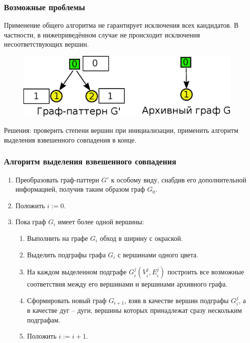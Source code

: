 \documentclass{beamer}
\begin{document}
\begin{frame}
\frametitle{Возможные проблемы}
Применение общего алгоритма не гарантирует исключения всех кандидатов. В частности, в нижеприведённом случае не происходит исключения несоответствующих вершин.

\begin{figure}[H]
	\centering
	\includegraphics[width=1\textwidth]{problem}
	\label{fig:problem}
\end{figure}

Решения: проверить степени вершин при инициализации, применить алгоритм выделения взвешенного совпадения в конце.
\end{frame}

\begin{frame}
\frametitle{Алгоритм выделения взвешенного совпадения}
\begin{enumerate}
	\item Преобразовать граф-паттерн $G'$ к особому виду, снабдив его дополнительной информацией, получив таким образом граф $G_0$.
	\item Положить $i := 0$.
	\item Пока граф $G_i$ имеет более одной вершины:
	\begin{enumerate}
		\item Выполнить на графе $G_i$ обход в ширину с окраской.
		\item Выделить подграфы графа $G_i$ с вершинами одного цвета.
		\item На каждом выделенном подграфе $G_i^j(V_i^j, E_i^j)$ построить все возможные соответствия между его вершинами и вершинами архивного графа.
		\item Сформировать новый граф $G_{i+1}$, взяв в качестве вершин подграфы $G_i^j$, а в качестве дуг -- дуги, вершины которых принадлежат сразу нескольким подграфам.
		\item Положить $i := i + 1$.
	\end{enumerate}
\end{enumerate}
\end{frame}
\end{document}
